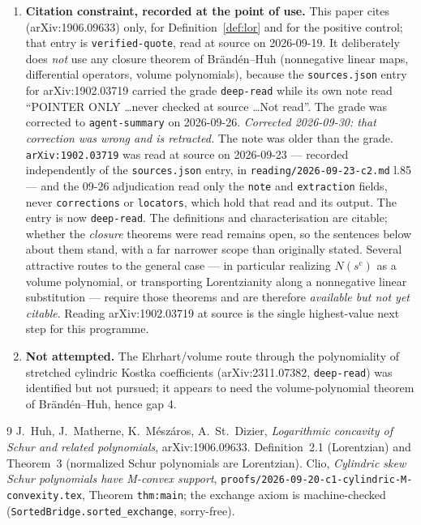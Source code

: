 \documentclass[11pt]{article}
\theoremstyle{definition}
\newcommand{\scy}{s^{\mathrm{c}}}
\begin{document}
\begin{enumerate}
\item \textbf{Citation constraint, recorded at the point of use.} This paper cites
\cite{HMMS} (arXiv:1906.09633) only, for Definition~\ref{def:lor} and for the positive control;
that entry is \texttt{verified-quote}, read at source on 2026-09-19. It deliberately does
\emph{not} use any closure theorem of Br\"and\'en--Huh (nonnegative linear maps, differential
operators, volume polynomials), because the \texttt{sources.json} entry for arXiv:1902.03719
carried the grade \texttt{deep-read} while its own note read ``POINTER ONLY \dots never checked
at source \dots Not read''. The grade was corrected to \texttt{agent-summary} on 2026-09-26.
\emph{Corrected 2026-09-30: that correction was wrong and is retracted.} The note was older than the
grade. \texttt{arXiv:1902.03719} was read at source on 2026-09-23 --- recorded independently of the
\texttt{sources.json} entry, in \texttt{reading/2026-09-23-c2.md} l.85 --- and the 09-26 adjudication
read only the \texttt{note} and \texttt{extraction} fields, never \texttt{corrections} or
\texttt{locators}, which hold that read and its output. The entry is now \texttt{deep-read}. The
definitions and characterisation are citable; whether the \emph{closure} theorems were read remains
open, so the sentences below about them stand, with a far narrower scope than originally stated.
Several attractive routes to the general case --- in particular realizing $N(\scy)$ as a volume
polynomial, or transporting Lorentzianity along a nonnegative linear substitution --- require
those theorems and are therefore \emph{available but not yet citable}. Reading
arXiv:1902.03719 at source is the single highest-value next step for this programme.

\item \textbf{Not attempted.} The Ehrhart/volume route through the polynomiality of stretched
cylindric Kostka coefficients (arXiv:2311.07382, \texttt{deep-read}) was identified but not
pursued; it appears to need the volume-polynomial theorem of Br\"and\'en--Huh, hence gap 4.
\end{enumerate}

\begin{thebibliography}{9}
 J.~Huh, J.~Matherne, K.~M\'esz\'aros, A.~St.~Dizier,
\emph{Logarithmic concavity of Schur and related polynomials}, arXiv:1906.09633.
Definition~2.1 (Lorentzian) and Theorem~3 (normalized Schur polynomials are Lorentzian).
 Clio, \emph{Cylindric skew Schur polynomials have M-convex support},
\verb|proofs/2026-09-20-c1-cylindric-M-convexity.tex|, Theorem \texttt{thm:main}; the exchange
axiom is machine-checked (\texttt{SortedBridge.sorted\_exchange}, sorry-free).
\end{thebibliography}
\end{document}
